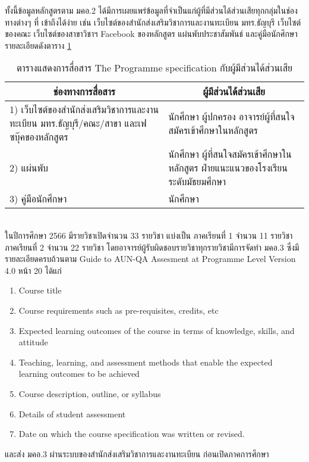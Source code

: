 ทั้งนี้ข้อมูลหลักสูตรตาม มคอ.2 ได้มีการเผยแพร่ข้อมูลที่จำเป็นแก่ผู้ที่มีส่วนได้ส่วนเสียทุกกลุ่มในช่องทางต่างๆ ที่
เข้าถึงได้ง่าย เช่น เว็บไซต์ของสำนักส่งเสริมวิชาการและงานทะเบียน มทร.ธัญบุรี
เว็บไซต์ของคณะ เว็บไซต์ของสาขาวิชาฯ Facebook ของหลักสูตร แผ่นพับประชาสัมพันธ์ และคู่มือนักศึกษา รายละเอียดดังตาราง \ref{Table:M2-13}
\newpage
\begin{longtable}{|p{}|p{}|}
	\caption{ตารางแสดงการสื่อสาร The Programme specification กับผู้มีส่วนได้ส่วนเสีย}
	\label{Table:M2-13}
\\
\hline
\multicolumn{1}{|c|}{\bf ช่องทางการสื่อสาร}&\multicolumn{1}{c|}{\bf ผู้มีส่วนได้ส่วนเสีย}\\
\hline
\endhead
1) เว็บไซต์ของสำนักส่งเสริมวิชาการและงานทะเบียน มทร.ธัญบุรี\newline/คณะ/สาขา และเฟซบุ๊คของหลักสูตร& นักศึกษา ผู้ปกครอง อาจารย์\newline ผู้ที่สนใจสมัครเข้าศึกษาในหลักสูตร\\\hline
\hline
2) แผ่นพับ& นักศึกษา\newline 
ผู้ที่สนใจสมัครเข้าศึกษาในหลักสูตร\newline 
ฝ่ายแนะแนวของโรงเรียนระดับมัธยมศึกษา
\\\hline
\hline
3) คู่มือนักศึกษา& นักศึกษา\\\hline
\end{longtable}	
\\
ในปีการศึกษา 2566 มีรายวิชาเปิดจำนวน 33  รายวิชา แบ่งเป็น
ภาคเรียนที่ 1 จำนวน 11 รายวิชา ภาคเรียนที่ 2 จำนวน 22 รายวิชา โดยอาจารย์ผู้รับผิดชอบรายวิชาทุกรายวิชามีการจัดทำ มคอ.3 ซึ่งมีรายละเอียดครบถ้วนตาม Guide to
AUN-QA Assesment at Programme Level Version 4.0 หน้า 20 ได้แก่
\begin{enumerate}
	\item Course title
	\item Course requirements such as pre-requisites, credits, etc
	\item Expected learning outcomes of the course in terms of knowledge, skills, and
	attitude
	\item Teaching, learning, and assessment methods that enable the expected learning outcomes to be achieved
	\item Course description, outline, or syllabus
	\item Details of student assessment
	\item Date on which the course specification was written or revised.
\end{enumerate}
และส่ง มคอ.3 ผ่านระบบของสำนักส่งเสริมวิชาการและงานทะเบียน ก่อนเปิดภาคการศึกษา

